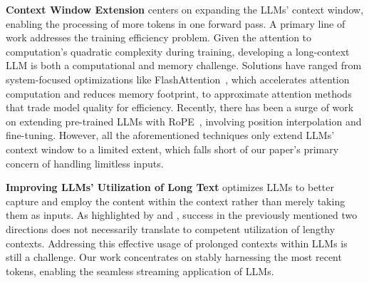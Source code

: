 \textbf{Context Window Extension} centers on expanding the LLMs' context window, enabling the processing of more tokens in one forward pass. A primary line of work addresses the training efficiency problem. Given the attention to computation's quadratic complexity during training, developing a long-context LLM is both a computational and memory challenge. Solutions have ranged from system-focused optimizations like FlashAttention~\citep{dao2022flashattention, dao2023flashattention2}, which accelerates attention computation and reduces memory footprint, to approximate attention methods~\citep{zaheer2020bigbird,beltagy2020longformer,wang2020linformer,kitaev2020reformer} that trade model quality for efficiency. Recently, there has been a surge of work on extending pre-trained LLMs with RoPE~\citep{chen2023extending,kaiokendev,blocntkaware,peng2023yarn}, involving position interpolation and fine-tuning. However, all the aforementioned techniques only extend LLMs' context window to a limited extent, which falls short of our paper's primary concern of handling limitless inputs.

\textbf{Improving LLMs' Utilization of Long Text} optimizes LLMs to better capture and employ the content within the context rather than merely taking them as inputs. As highlighted by \citeauthor{liu2023lost} and \citeauthor{longchat2023}, success in the previously mentioned two directions does not necessarily translate to competent utilization of lengthy contexts. Addressing this effective usage of prolonged contexts within LLMs is still a challenge. Our work concentrates on stably harnessing the most recent tokens, enabling the seamless streaming application of LLMs.
